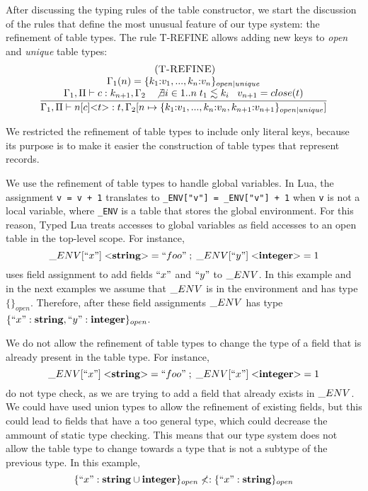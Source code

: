 After discussing the typing rules of the table constructor,
we start the discussion of the rules that define the most
unusual feature of our type system: the refinement of table types.
The rule \textsc{T-REFINE} allows adding new keys to \emph{open}
and \emph{unique} table types:
\[
\begin{array}{c}
\; (\textsc{T-REFINE})\\
\dfrac{\begin{array}{c}
       \Gamma_{1}(n) = \{ k_{1}{:}v_{1}, ..., k_{n}{:}v_{n} \}_{open|unique}\\
       \Gamma_{1}, \Pi \vdash c:k_{n+1}, \Gamma_{2} \;\;\;
       \not \exists i \in 1..n \; t_{1} \lesssim k_{i} \;\;\;
       v_{n+1} = close(t)
       \end{array}}
      {\Gamma_{1}, \Pi \vdash n[c] {<}t{>}:t, \Gamma_{2}[n \mapsto \{ k_{1}{:}v_{1}, ..., k_{n}{:}v_{n}, k_{n+1}{:}v_{n+1}\}_{open|unique}]}
\end{array}
\]

We restricted the refinement of table types to include only literal
keys, because its purpose is to make it easier the construction of
table types that represent records.

We use the refinement of table types to handle global variables.
In Lua, the assignment \texttt{v = v + 1} translates to
\texttt{\string_ENV["v"] = \string_ENV["v"] + 1} when \texttt{v}
is not a local variable, where \texttt{\string_ENV} is a table
that stores the global environment.
For this reason, Typed Lua treats accesses to global variables as field accesses
to an open table in the top-level scope.
For instance,
\[
\string_ENV[``x"] \; {<}\String{>} = ``foo" \;;\; \string_ENV[``y"] \; {<}\Integer{>} = 1
\]
uses field assignment to add fields $``x"$ and $``y"$ to $\string_ENV$.
In this example and in the next examples we assume that
$\string_ENV$ is in the environment and has type $\{\}_{open}$.
Therefore, after these field assignments $\string_ENV$ has type
$\{``x":\mathbf{string}, ``y":\mathbf{integer}\}_{open}$.

We do not allow the refinement of table types to change the type of
a field that is already present in the table type.
For instance,
\[
\string_ENV[``x"] \; {<}\String{>} = ``foo" \;;\; \string_ENV[``x"] \; {<}\Integer{>} = 1
\]
do not type check, as we are trying to add a field that already exists
in $\string_ENV$.
We could have used union types to allow the refinement of existing fields,
but this could lead to fields that have a too general type, which could
decrease the ammount of static type checking.
This means that our type system does not allow the table type to change
towards a type that is not a subtype of the previous type.
In this example,
\[
\{``x":\mathbf{string} \cup \mathbf{integer}\}_{open} \not<: \{``x":\mathbf{string}\}_{open}
\]

